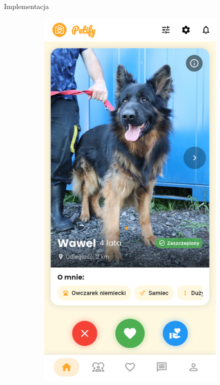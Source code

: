 \documentclass[final]{beamer} %
\begin{document}
\begin{frame}{}
\begin{columns}[T]
\begin{column}[T]{0.48\textwidth}
\begin{block}{Implementacja}
\begin{figure}[h]
\begin{subfigure}{0.325\textwidth}
    \includegraphics[width=\textwidth]{app-main.png}
\end{subfigure}
\begin{subfigure}{0.325\textwidth}

\end{subfigure}
\end{figure}
\end{block}
\end{column}
\end{columns}
\end{frame}
\end{document}
